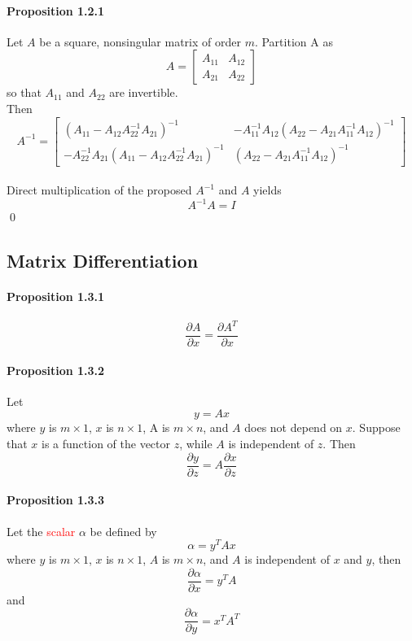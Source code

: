\documentclass[11pt]{article}
\begin{document}
\paragraph{Proposition 1.2.1}
Let $A$ be a square, nonsingular matrix of order $m$. Partition A as
$$ A = \begin{bmatrix}
	A_{11} & A_{12} \\
	A_{21} & A_{22}
\end{bmatrix}
$$
so that $A_{11}$ and $A_{22}$ are invertible. \\
Then
$$ A^{-1} = \begin{bmatrix}
	(A_{11} - A_{12}A_{22}^{-1}A_{21})^{-1} & -A_{11}^{-1}A_{12}(A_{22} - A_{21}A_{11}^{-1}A_{12})^{-1} \\
	-A_{22}^{-1}A_{21}(A_{11} - A_{12}A_{22}^{-1}A_{21})^{-1} & (A_{22} - A_{21}A_{11}^{-1}A_{12})^{-1}
\end{bmatrix}$$
 \\
Direct multiplication of the proposed $A^{-1}$ and $A$ yields
$$A^{-1}A = I$$ \qed

\subsection{Matrix Differentiation}
\paragraph{Proposition 1.3.1}
$$\frac{\partial A}{\partial x} = \frac{\partial A^T}{\partial x}$$
\paragraph{Proposition 1.3.2}
Let $$y = Ax$$
where $y$ is $m\times 1$, $x$ is $n \times 1$, A is $m \times n$, and $A$ does not depend on $x$. Suppose that $x$ is a function of the vector $z$, while $A$ is independent of $z$. Then
$$\frac{\partial y }{\partial z} = A \frac{\partial x}{\partial z}$$

\paragraph{Proposition 1.3.3}
Let the \textcolor{red}{scalar} $\alpha$ be defined by
$$\alpha = y^T Ax$$
where $y$ is $m \times 1$, $x$ is $n \times 1$, $A$ is $m \times n$, and $A$ is independent of $x$ and $y$, then
$$\frac{\partial \alpha}{\partial x} = y^TA$$
and 
$$\frac{\partial \alpha}{\partial y} = x^TA^T$$
\end{document}
